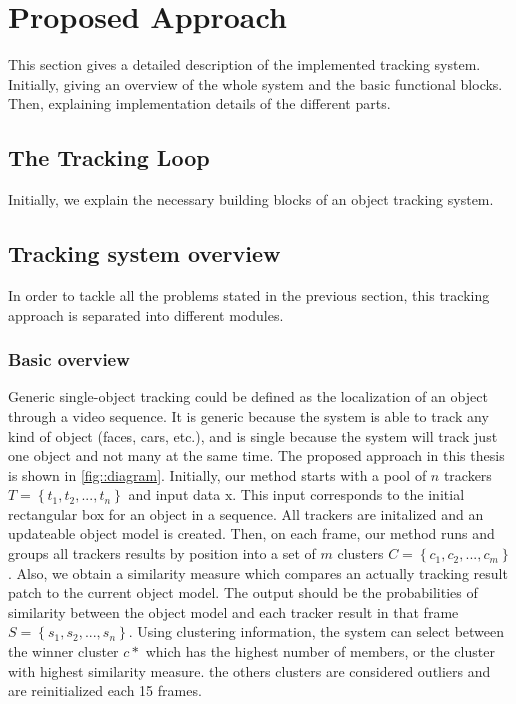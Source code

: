 
\chapter{Proposed Approach} %

\label{chapter4} %


This section gives a detailed description of the implemented tracking system. Initially, giving an overview of the whole system and the basic functional blocks. Then, explaining implementation details of the different parts.

\section{The Tracking Loop}

Initially,  we explain the necessary building blocks of an object tracking system.

\section{Tracking system overview}

In order to tackle all the problems stated in the previous section, this tracking approach is separated into different modules.

\subsection{Basic overview}

Generic single-object tracking could be defined as the localization of an object through a video sequence. It is generic because the system is able to track any kind of object (faces, cars, etc.), and is single because the system will track just one object and not many at the same time. The proposed approach in this thesis is shown in \ref{fig::diagram}. Initially, our method starts with a pool of $n$ trackers $T = \left \{ t_1, t_2, ..., t_n \right \}$ and input data $\mathrm{x}$. This input corresponds to the initial rectangular box for an object in a sequence. All trackers are initalized and an updateable object model is created. Then, on each frame, our method runs and groups all trackers results by position into a set of $m$ clusters $C = \left \{ c_1, c_2, ..., c_m \right \}$. Also, we obtain a similarity measure which compares an actually tracking result patch to the current object model. The output should be the probabilities of similarity between the object model and each tracker result in that frame $S = \left \{ s_1, s_2, ..., s_n \right \}$. Using clustering information, the system can select between the winner cluster $c*$ which has the highest number of members, or the cluster with highest similarity measure. the others clusters are considered outliers and are reinitialized each 15 frames.

